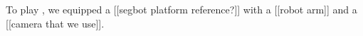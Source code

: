 To play \ispy, we equipped a [[segbot platform reference?]] with a [[robot arm]] and a [[camera that we use]].

